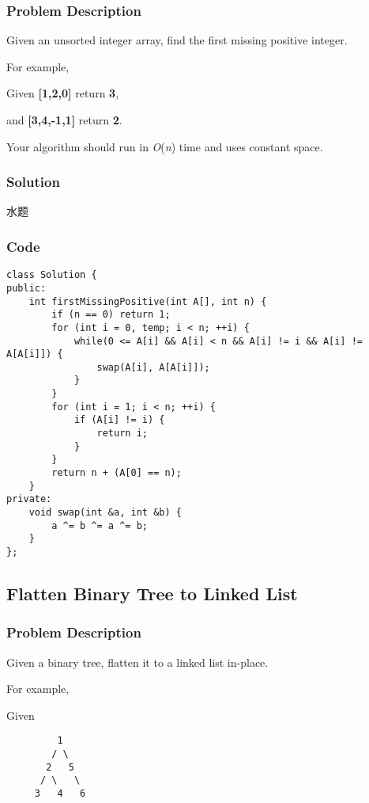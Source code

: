 \documentclass[courier]{article}
\begin{document}
\begin{CJK*}{UTF8}{gkai}
\subsubsection*{Problem Description}
Given an unsorted integer array, find the first missing positive integer.

For example,


Given \textbf{[1,2,0]} return \textbf{3},


and \textbf{[3,4,-1,1]} return \textbf{2}.

Your algorithm should run in \emph{O}(\emph{n}) time and uses constant space.



\subsubsection*{Solution}
水题

\subsubsection*{Code}
\begin{lstlisting}
class Solution {
public:
    int firstMissingPositive(int A[], int n) {
        if (n == 0) return 1;
        for (int i = 0, temp; i < n; ++i) {
            while(0 <= A[i] && A[i] < n && A[i] != i && A[i] != A[A[i]]) {
                swap(A[i], A[A[i]]);
            }
        }
        for (int i = 1; i < n; ++i) {
            if (A[i] != i) {
                return i;
            }
        }
        return n + (A[0] == n);
    }
private:
    void swap(int &a, int &b) {
        a ^= b ^= a ^= b;
    }
}; 
\end{lstlisting}


\subsection{ Flatten Binary Tree to Linked List }

\subsubsection*{Problem Description}
Given a binary tree, flatten it to a linked list in-place.

For example,


Given
\begin{verbatim}
         1
        / \
       2   5
      / \   \
     3   4   6
\end{verbatim}


\end{CJK*}
\end{document}
